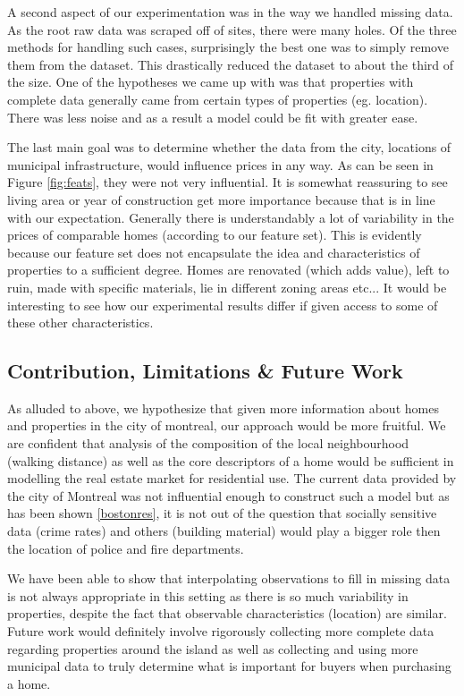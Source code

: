 \documentclass{acm_proc_article-sp}
\begin{document}
	A second aspect of our experimentation was in the way we handled missing data. As the root raw data was scraped off of sites, there were many holes. Of the three methods for handling such cases, surprisingly the best one was to simply remove them from the dataset. This drastically reduced the dataset to about the third of the size. One of the hypotheses we came up with was that properties with complete data generally came from certain types of properties (eg. location). There was less noise and as a result a model could be fit with greater ease. 
	
	The last main goal was to determine whether the data from the city, locations of municipal infrastructure, would influence prices in any way. As can be seen in Figure \ref{fig:feats}, they were not very influential. It is somewhat reassuring to see living area or year of construction get more importance because that is in line with our expectation. Generally there is understandably a lot of variability in the prices of comparable homes (according to our feature set). This is evidently because our feature set does not encapsulate the idea and characteristics of properties to a sufficient degree. Homes are renovated (which adds value), left to ruin, made with specific materials, lie in different zoning areas etc... It would be interesting to see how our experimental results differ if given access to some of these other characteristics. 
	
\subsection{Contribution, Limitations \& Future Work}
	As alluded to above, we hypothesize that given more information about homes and properties in the city of montreal, our approach would be more fruitful. We are confident that analysis of the composition of the local neighbourhood (walking distance) as well as the core descriptors of a home would be sufficient in modelling the real estate market for residential use. The current data provided by the city of Montreal was not influential enough to construct such a model but as has been shown \ref{bostonres}, it is not out of the question that socially sensitive data (crime rates) and others (building material) would play a bigger role then the location of police and fire departments.
	
	We have been able to show that interpolating observations to fill in missing data is not always appropriate in this setting as there is so much variability in properties, despite the fact that observable characteristics (location) are similar. Future work would definitely involve rigorously collecting more complete data regarding properties around the island as well as collecting and using more municipal data to truly determine what is important for buyers when purchasing a home.
	
\end{document}

